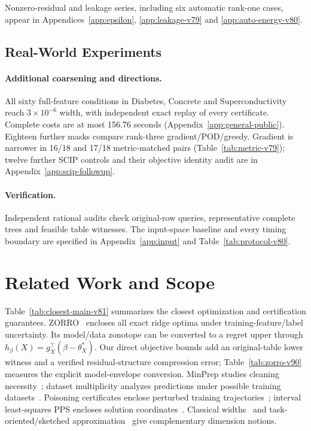 Nonzero-residual and leakage series, including six automatic rank-one cases, appear in Appendices~\ref{app:epsilon}, \ref{app:leakage-v79} and \ref{app:auto-energy-v80}.

\subsection{Real-World Experiments}


\paragraph{Additional coarsening and directions.}
All sixty full-feature conditions in Diabetes, Concrete and Superconductivity~\citep{efron2004,sklearn,uci_concrete,uci_super} reach $3\times10^{-6}$ width, with independent exact replay of every certificate. Complete costs are at most 156.76 seconds (Appendix~\ref{app:general-public}). Eighteen further masks compare rank-three gradient/POD/greedy. Gradient is narrower in 16/18 and 17/18 metric-matched pairs (Table~\ref{tab:metric-v79}); twelve further SCIP controls and their objective identity audit are in Appendix~\ref{app:scip-followup}.



\paragraph{Verification.}
Independent rational audits check original-row queries, representative complete trees and feasible table witnesses. The input-space baseline and every timing boundary are specified in Appendix~\ref{app:input} and Table~\ref{tab:protocol-v80}.

\section{Related Work and Scope}
Table~\ref{tab:closest-main-v81} summarizes the closest optimization and certification guarantees. ZORRO~\citep[Theorem 4.2]{zhu2024zorro} encloses all exact ridge optima under training-feature/label uncertainty. Its model/data zonotope can be converted to a regret upper through $h_\beta(X)=g_X^\top(\beta-\theta_X^*)$. Our direct objective bounds add an original-table lower witness and a verified residual-structure compression error; Table~\ref{tab:zorro-v90} measures the explicit model-envelope conversion. MinPrep studies cleaning necessity~\citep{minprep2026}; dataset multiplicity analyzes predictions under possible training datasets~\citep{meyer2023}. Poisoning certificates enclose perturbed training trajectories~\citep{sosnin2025,lorenz2025mibp}; interval least-squares PPS encloses solution coordinates~\citep{shary2021}. Classical widths~\citep{binev2011} and task-oriented/sketched approximation~\citep{chen2025coupled,patil2024sketched} give complementary dimension notions.
